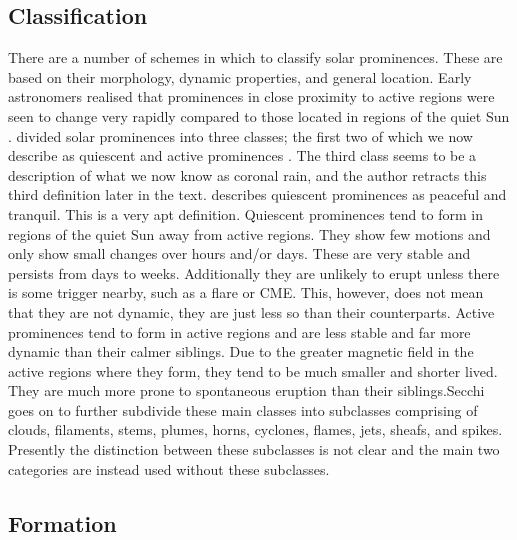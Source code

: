 \subsection{Classification}
There are a number of schemes in which to classify solar prominences. These are based on their morphology, dynamic properties, and general location. Early astronomers realised that prominences in close proximity to active regions were seen to change very rapidly compared to those located in regions of the quiet Sun \citep{vial_solar_2015}. \cite{secchi_soleil_1875} divided solar prominences into three classes; the first two of which we now describe as quiescent and active prominences \citep{tandberg-hanssen_nature_1995}. The third class seems to be a description of what we now know as coronal rain, and the author retracts this third definition later in the text. \cite{secchi_soleil_1875} describes quiescent prominences as peaceful and tranquil. This is a very apt definition. Quiescent prominences tend to form in regions of the quiet Sun away from active regions. They show few motions and only show small changes over hours and/or days. These are very stable and persists from days to weeks. Additionally they are unlikely to erupt unless there is some trigger nearby, such as a flare or CME. This, however, does not mean that they are not dynamic, they are just less so than their counterparts. Active prominences tend to form in active regions and are less stable and far more dynamic than their calmer siblings. Due to the greater magnetic field in the active regions where they form, they tend to be much smaller and shorter lived. They are much more prone to spontaneous eruption than their siblings.Secchi goes on to further subdivide these main classes into subclasses comprising of clouds, filaments, stems, plumes, horns, cyclones, flames, jets, sheafs, and spikes. Presently the distinction between these subclasses is not clear and the main two categories are instead used without these subclasses.

\subsection{Formation}

